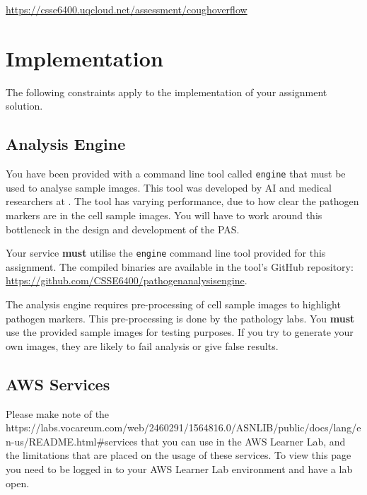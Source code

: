 \documentclass{csse4400}
\begin{document}
\url{https://csse6400.uqcloud.net/assessment/coughoverflow}


\section{Implementation}
The following constraints apply to the implementation of your assignment solution.

\subsection{Analysis Engine}

You have been provided with a command line tool called \texttt{engine} that must be used to analyse sample images.
This tool was developed by AI and medical researchers at
.
The tool has varying performance, due to how clear the pathogen markers are in the cell sample images.
You will have to work around this bottleneck in the design and development of the PAS.

Your service \textbf{must} utilise the \texttt{engine} command line tool provided for this assignment.
The compiled binaries are available in the tool's GitHub repository: \url{https://github.com/CSSE6400/pathogenanalysisengine}.


The analysis engine requires pre-processing of cell sample images to highlight pathogen markers.
This pre-processing is done by the pathology labs.
You \textbf{must} use the provided sample images for testing purposes.
If you try to generate your own images, they are likely to fail analysis or give false results.


\subsection{AWS Services}
Please make note of the 
{https://labs.vocareum.com/web/2460291/1564816.0/ASNLIB/public/docs/lang/en-us/README.html\#services}
that you can use in the AWS Learner Lab, and the limitations that are placed on the usage of these services.
To view this page you need to be logged in to your AWS Learner Lab environment and have a lab open.
\end{document}
